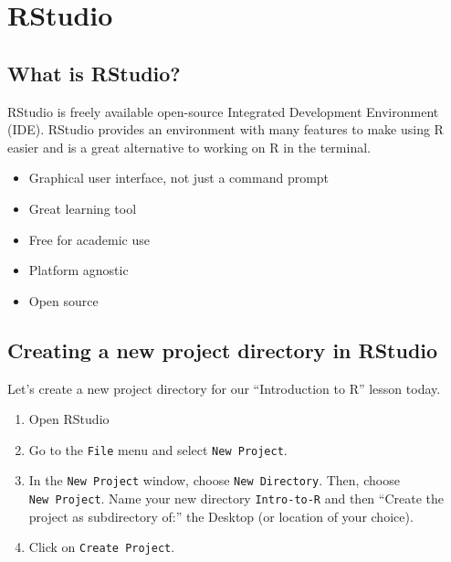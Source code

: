 \documentclass[
]{article}
\providecommand{\tightlist}{%
  \setlength{\itemsep}{0pt}\setlength{\parskip}{0pt}}
\begin{document}
\hypertarget{section-1}{%
\subsection{}\label{section-1}}

\hypertarget{section-2}{%
\subsection{}\label{section-2}}

\hypertarget{section-3}{%
\subsection{}\label{section-3}}

\hypertarget{rstudio}{%
\section{RStudio}\label{rstudio}}

\hypertarget{what-is-rstudio}{%
\subsection{What is RStudio?}\label{what-is-rstudio}}

RStudio is freely available open-source Integrated Development
Environment (IDE). RStudio provides an environment with many features to
make using R easier and is a great alternative to working on R in the
terminal.

\begin{itemize}
\tightlist
\item
  Graphical user interface, not just a command prompt
\item
  Great learning tool
\item
  Free for academic use
\item
  Platform agnostic
\item
  Open source
\end{itemize}

\hypertarget{creating-a-new-project-directory-in-rstudio}{%
\subsection{Creating a new project directory in
RStudio}\label{creating-a-new-project-directory-in-rstudio}}

Let's create a new project directory for our ``Introduction to R''
lesson today.

\begin{enumerate}
\def\labelenumi{\arabic{enumi}.}
\tightlist
\item
  Open RStudio
\item
  Go to the \texttt{File} menu and select \texttt{New\ Project}.
\item
  In the \texttt{New\ Project} window, choose \texttt{New\ Directory}.
  Then, choose \texttt{New\ Project}. Name your new directory
  \texttt{Intro-to-R} and then ``Create the project as subdirectory
  of:'' the Desktop (or location of your choice).
\item
  Click on \texttt{Create\ Project}.
\end{enumerate}
\end{document}
